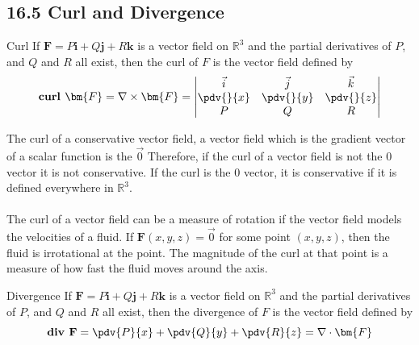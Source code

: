 \documentclass{article}
\begin{document}
	\subsection{16.5 Curl and Divergence}
	\begin{mybox}
		{Curl} If $\bm{F}= P \bm{i}+ Q \bm{j}+ R\bm{k}$ is a vector field on $\mathbb{R}
		^{3}$ and the partial derivatives of $P$, and $Q$ and $R$ all exist, then the
		curl of $F$ is the vector field defined by
		\[
			\textbf{curl }\bm{F}= \nabla \times \bm{F}=
			\begin{vmatrix}
				\vec{i}   & \vec{j}   & \vec{k}   \\
				\pdv{}{x} & \pdv{}{y} & \pdv{}{z} \\
				P         & Q         & R
			\end{vmatrix}
		\]
	\end{mybox}
	The curl of a conservative vector field, a vector field which is the gradient vector
	of a scalar function is the $\vec{0}$ Therefore, if the curl of a vector field
	is not the $0$ vector it is not conservative. If the curl is the $0$ vector,
	it is conservative if it is defined everywhere in $\mathbb{R}^{3}$.\\\\ The curl
	of a vector field can be a measure of rotation if the vector field models the velocities
	of a fluid. If $\bm{F}(x,y,z)=\vec{0}$ for some point $(x,y,z)$, then the fluid
	is irrotational at the point. The magnitude of the curl at that point is a
	measure of how fast the fluid moves around the axis.
	\begin{mybox}
		{Divergence} If $\bm{F}= P \bm{i}+ Q \bm{j}+ R\bm{k}$ is a vector field on $\mathbb{R}
		^{3}$ and the partial derivatives of $P$, and $Q$ and $R$ all exist, then the
		divergence of $F$ is the vector field defined by
		\[
			\textbf{div }\textbf{F}= \pdv{P}{x}+ \pdv{Q}{y}+ \pdv{R}{z}= \nabla \cdot \bm
			{F}
		\]
	\end{mybox}
\end{document}
